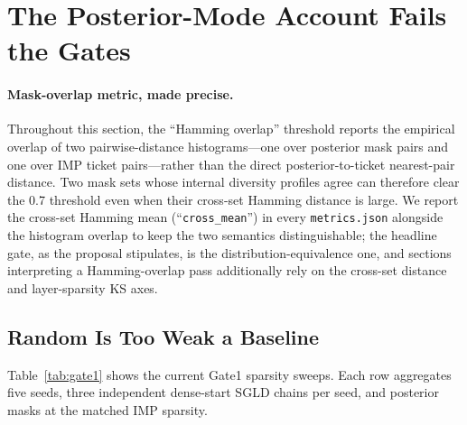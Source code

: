 \documentclass{article}
\begin{document}
\section{The Posterior-Mode Account Fails the Gates}
\label{sec:posterior-fails}

\paragraph{Mask-overlap metric, made precise.}
Throughout this section, the ``Hamming overlap'' threshold reports the
empirical overlap of two pairwise-distance histograms---one over posterior
mask pairs and one over IMP ticket pairs---rather than the direct
posterior-to-ticket nearest-pair distance. Two mask sets whose internal
diversity profiles agree can therefore clear the 0.7 threshold even when
their cross-set Hamming distance is large. We report the cross-set Hamming
mean (``\texttt{cross\_mean}'') in every \texttt{metrics.json} alongside
the histogram overlap to keep the two semantics distinguishable; the
headline gate, as the proposal stipulates, is the distribution-equivalence
one, and sections interpreting a Hamming-overlap pass additionally rely on
the cross-set distance and layer-sparsity KS axes.

\subsection{Random Is Too Weak a Baseline}

Table~\ref{tab:gate1} shows the current Gate1 sparsity sweeps. Each row
aggregates five seeds, three independent dense-start SGLD chains per seed, and
posterior masks at the matched IMP sparsity.
\end{document}
